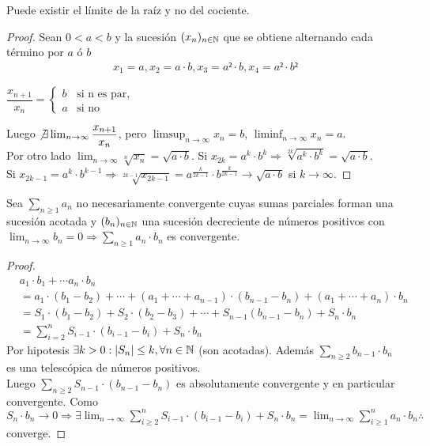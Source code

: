 \begin{eg}
  Puede existir el límite de la raíz y no del cociente.
  \begin{proof}
    Sean \(0 < a < b\) y la sucesión \((x_n)_{n \in \mathbb{N}}\) que se obtiene alternando cada término por \(a\) ó \(b\) \begin{align*}
      x_1 = a, x_2 = a \cdot b, x_3 = a² \cdot b, x_4 = a² \cdot b²
    \end{align*}

    \(\dfrac{x_{n+1}}{x_n} = \begin{cases}
        b & \text{si n es par}, \\
        a & \text{si no}
      \end{cases}\)

    Luego \(\not \exists \lim_{n \to \infty} \dfrac{x_{n+1}}{x_n}\), pero \(\limsup_{n \to \infty} x_n = b\), \(\liminf_{n \to \infty} x_n = a\). \\
    Por otro lado \(\lim_{n \to \infty} \sqrt[n]{x_n} = \sqrt{a \cdot b}\). Si \(x_{2k} = a^k \cdot b^k \Rightarrow \sqrt[2k]{a^k \cdot b^k} = \sqrt{a \cdot b}\). \\
    Si \(x_{2k-1} = a^k \cdot b^{k-1} \Rightarrow \sqrt[2k-1]{x_{2k-1}} = a^{\frac{k}{2k-1}} \cdot b^{\frac{k}{2k-1}} \to \sqrt{a \cdot b}\) si \(k \to \infty\).
  \end{proof}
\end{eg}

\begin{theorem}[Dirichlet]
  Sea \(\sum_{n \geq 1} a_n\) no necesariamente convergente cuyas sumas parciales forman una sucesión acotada y \((b_n)_{n \in \mathbb{N}}\) una sucesión decreciente de números positivos con \(\lim_{n \to \infty} b_n = 0 \Rightarrow \sum_{n \geq 1} a_n \cdot b_n\) es convergente.

  \begin{proof}
    \begin{align*}
       & a_1 \cdot b_1 + \cdots a_n \cdot b_n                                                                                \\
       & = a_1 \cdot (b_1 - b_2) +  \cdots + (a_1 + \cdots + a_{n-1}) \cdot (b_{n-1} - b_n) + (a_1 + \cdots + a_n) \cdot b_n \\
       & = S_1 \cdot (b_1 - b_2) + S_2 \cdot (b_2 - b_3) + \cdots + S_{n-1} (b_{n-1} - b_n) + S_n \cdot b_n                  \\
       & = \sum_{i = 2}^n S_{i-1} \cdot (b_{i-1} - b_i) + S_n \cdot b_n
    \end{align*}
    Por hipotesis \(\exists k > 0 : |S_n| \leq k, \forall n \in \mathbb{N}\) (son acotadas). Además \(\sum_{n \geq 2} b_{n-1} \cdot b_n\) es una telescópica de números positivos. \\
    Luego \(\sum_{n \geq 2} S_{n-1} \cdot (b_{n-1} - b_n)\) es absolutamente convergente y en particular convergente.
    Como \(S_n \cdot b_n \to 0 \Rightarrow \exists \lim_{n \to \infty} \sum_{i \geq 2}^n S_{i-1} \cdot (b_{i-1} - b_i) + S_n \cdot b_n = \lim_{n \to \infty} \sum_{i \geq 1}^n a_n \cdot b_n \therefore\) converge.
  \end{proof}
\end{theorem}

